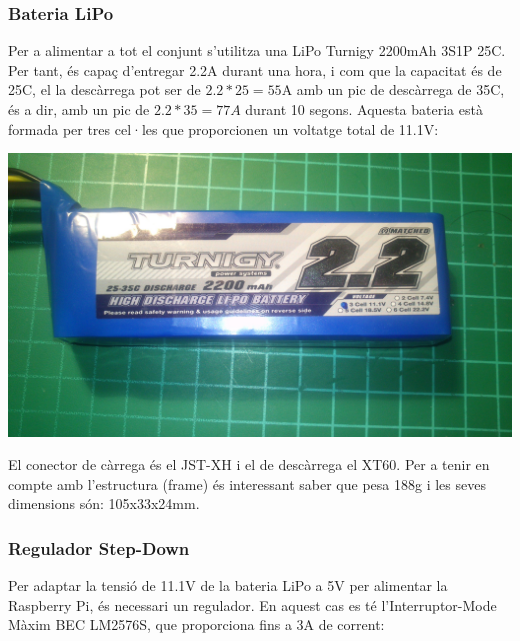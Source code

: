 \documentclass[twoside]{article}
\begin{document}
\subsubsection*{Bateria LiPo}
Per a alimentar a tot el conjunt s'utilitza una LiPo Turnigy 2200mAh 3S1P 25C. Per tant, és capaç d'entregar 2.2A durant una hora, i com que la capacitat és de 25C, el la descàrrega pot ser de $2.2*25=55$A amb un pic de descàrrega de 35C, és a dir, amb un pic de $2.2*35=77A$ durant 10 segons. Aquesta bateria està formada per tres cel·les que proporcionen un voltatge total de 11.1V:\\
\begin{center}
\includegraphics[scale=0.1,viewport=0 400 2560 1250,clip]{images/LiPo.jpg} \\
\end{center}
El conector de càrrega és el JST-XH i el de descàrrega el XT60. Per a tenir en compte amb l'estructura (frame) és interessant saber que pesa 188g i les seves dimensions són:  105x33x24mm.

\subsubsection*{Regulador Step-Down}
Per adaptar la tensió de 11.1V de la bateria LiPo a 5V per alimentar la Raspberry Pi, és necessari un regulador. En aquest cas es té l'Interruptor-Mode Màxim BEC LM2576S, que proporciona fins a 3A de corrent:\\
\end{document}
